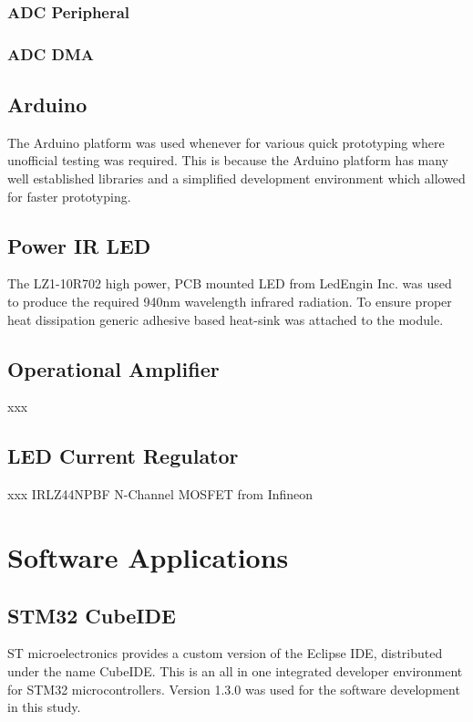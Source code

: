 \subsubsection{ADC Peripheral}

\subsubsection{ADC DMA}

\subsection{Arduino}
The Arduino platform was used whenever for various quick prototyping where unofficial testing was required. This is because the Arduino platform has many well established libraries and a simplified development environment which allowed for faster prototyping.

\subsection{Power IR LED}

The LZ1-10R702 high power, PCB mounted LED from LedEngin Inc. was used to produce the required 940nm wavelength infrared radiation. To ensure proper heat dissipation generic adhesive based heat-sink was attached to the module.

\subsection{Operational Amplifier}
xxx

\subsection{LED Current Regulator}
xxx
IRLZ44NPBF N-Channel MOSFET from Infineon




\section{Software Applications}

\subsection{STM32 CubeIDE}
ST microelectronics provides a custom version of the Eclipse IDE, distributed under the name CubeIDE. This is an all in one integrated developer environment for STM32 microcontrollers. Version 1.3.0 was used for the software development in this study.

